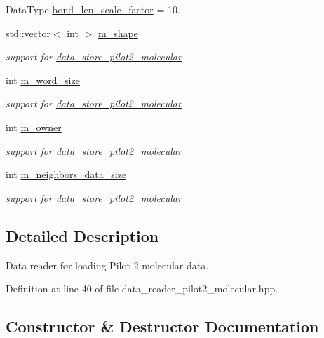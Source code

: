 \begin{DoxyCompactItemize}
\item 
Data\+Type \hyperlink{classlbann_1_1pilot2__molecular__reader_aa300abb1c1b72776c129487e57a7b70f}{bond\+\_\+len\+\_\+scale\+\_\+factor} = 10.
\item 
std\+::vector$<$ int $>$ \hyperlink{classlbann_1_1pilot2__molecular__reader_ae02769bc68f1e079c740f724ec6bd0c0}{m\+\_\+shape}
\begin{DoxyCompactList}\small\item\em support for \hyperlink{classlbann_1_1data__store__pilot2__molecular}{data\+\_\+store\+\_\+pilot2\+\_\+molecular} \end{DoxyCompactList}\item 
int \hyperlink{classlbann_1_1pilot2__molecular__reader_a1093a0518b7913c91e9b36679b198948}{m\+\_\+word\+\_\+size}
\begin{DoxyCompactList}\small\item\em support for \hyperlink{classlbann_1_1data__store__pilot2__molecular}{data\+\_\+store\+\_\+pilot2\+\_\+molecular} \end{DoxyCompactList}\item 
int \hyperlink{classlbann_1_1pilot2__molecular__reader_aa68c3ad1768cdd66188225b0136663b7}{m\+\_\+owner}
\begin{DoxyCompactList}\small\item\em support for \hyperlink{classlbann_1_1data__store__pilot2__molecular}{data\+\_\+store\+\_\+pilot2\+\_\+molecular} \end{DoxyCompactList}\item 
int \hyperlink{classlbann_1_1pilot2__molecular__reader_a0d61b0b65b1998694272a5d2173cbac7}{m\+\_\+neighbors\+\_\+data\+\_\+size}
\begin{DoxyCompactList}\small\item\em support for \hyperlink{classlbann_1_1data__store__pilot2__molecular}{data\+\_\+store\+\_\+pilot2\+\_\+molecular} \end{DoxyCompactList}\end{DoxyCompactItemize}


\subsection{Detailed Description}
Data reader for loading Pilot 2 molecular data. 

Definition at line 40 of file data\+\_\+reader\+\_\+pilot2\+\_\+molecular.\+hpp.



\subsection{Constructor \& Destructor Documentation}
\mbox{\label{classlbann_1_1pilot2__molecular__reader_ac883c7e0fcc935bc6573efa3352275ca}} 
